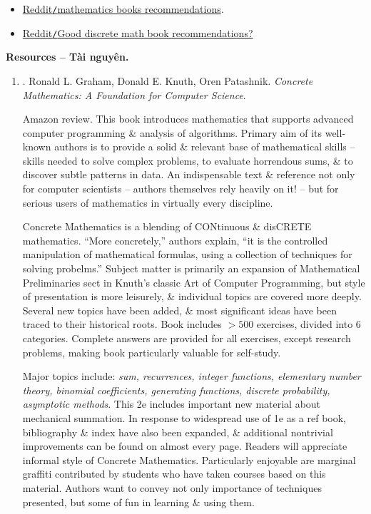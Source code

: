 \documentclass{article}
\begin{document}
\begin{itemize}
	\item \href{https://www.reddit.com/r/math/wiki/faq/#wiki_what_are_some_good_books_on_topic_x.3F}{Reddit{\tt/}mathematics books recommendations}.
	\item \href{https://www.reddit.com/r/math/comments/zo9kzy/good_discrete_math_book_recommendations/}{Reddit{\tt/}Good discrete math book recommendations?}
\end{itemize}
\textbf{\textsf{Resources -- Tài nguyên.}}
\begin{enumerate}
	\item \cite{Graham_Knuth_Patashnik1994}. {\sc Ronald L. Graham, Donald E. Knuth, Oren Patashnik}. {\it Concrete Mathematics: A Foundation for Computer Science}. {}
	
	{\sf Amazon review.} This book introduces mathematics that supports advanced computer programming \& analysis of algorithms. Primary aim of its well-known authors is to provide a solid \& relevant base of mathematical skills -- skills needed to solve complex problems, to evaluate horrendous sums, \& to discover subtle patterns in data. An indispensable text \& reference not only for computer scientists -- authors themselves rely heavily on it! -- but for serious users of mathematics in virtually every discipline.
	
	Concrete Mathematics is a blending of CONtinuous \& disCRETE mathematics. ``More concretely,'' authors explain, ``it is the controlled manipulation of mathematical formulas, using a collection of techniques for solving probelms.'' Subject matter is primarily an expansion of Mathematical Preliminaries sect in {\sc Knuth}'s classic Art of Computer Programming, but style of presentation is more leisurely, \& individual topics are covered more deeply. Several new topics have been added, \& most significant ideas have been traced to their historical roots. Book includes $> 500$ exercises, divided into 6 categories. Complete answers are provided for all exercises, except research problems, making book particularly valuable for self-study.
	
	Major topics include: {\it sum, recurrences, integer functions, elementary number theory, binomial coefficients, generating functions, discrete probability, asymptotic methods}. This 2e includes important new material about mechanical summation. In response to widespread use of 1e as a ref book, bibliography \& index have also been expanded, \& additional nontrivial improvements can be found on almost every page. Readers will appreciate informal style of Concrete Mathematics. Particularly enjoyable are marginal graffiti contributed by students who have taken courses based on this material. Authors want to convey not only importance of techniques presented, but some of fun in learning \& using them.
	

\end{enumerate}
\end{document}
